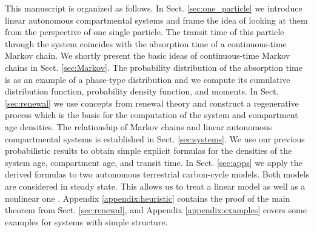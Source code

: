 \documentclass[smallextended]{svjour3}
\begin{document}
This manuscript is organized as follows.
In Sect. \ref{sec:one_particle} we introduce linear autonomous compartmental systems and frame the idea of looking at them from the perspective of one single particle.
The transit time of this particle through the system coincides with the absorption time of a continuous-time Markov chain.
We shortly present the basic ideas of continuous-time Markov chains in Sect. \ref{sec:Markov}.
The probability distribution of the absorption time is as an example of a phase-type distribution and we compute its cumulative distribution function, probability density function, and moments.
In Sect. \ref{sec:renewal} we use concepts from renewal theory and construct a regenerative process which is the basis for the computation of the system and compartment age densities.
The relationship of Markov chains and linear autonomous compartmental systems is established in Sect. \ref{sec:systems}.
We use our previous probabilistic results to obtain simple explicit formulas for the densities of the system age, compartment age, and transit time.
In Sect. \ref{sec:apps} we apply the derived formulas to two autonomous terrestrial carbon-cycle models.
Both models are considered in steady state. This allows us to treat a linear model \citep{Emanuel1981} as well as a nonlinear one \citep{Wang2014BG}.
Appendix \ref{appendix:heuristic} contains the proof of the main theorem from Sect. \ref{sec:renewal}, and Appendix \ref{appendix:examples} covers some examples for systems with simple structure.
\end{document}
